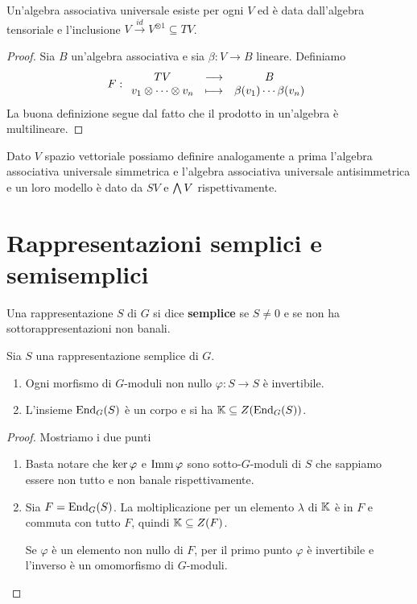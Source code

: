\begin{proposition}
Un'algebra associativa universale esiste per ogni $V$ ed \`e data dall'algebra tensoriale e l'inclusione $V\overset{id}{\to} V^{\otimes 1}\subseteq TV$.
\end{proposition}
\begin{proof}
Sia $B$ un'algebra associativa e sia $\beta:V\to B$ lineare. Definiamo
\[F:\begin{array}{ccc} {TV} & \longrightarrow & {B}\\ {v_1\otimes\cdots\otimes v_n} & \longmapsto & {\beta(v_1)\cdots \beta(v_n)} \end{array}\]
La buona definizione segue dal fatto che il prodotto in un'algebra \`e multilineare.
\end{proof}

\begin{remark}
Dato $V$ spazio vettoriale possiamo definire analogamente a prima l'algebra associativa universale simmetrica e l'algebra associativa universale antisimmetrica e un loro modello \`e dato da $SV$ e $\bigwedge V$ rispettivamente.
\end{remark}













\section{Rappresentazioni semplici e semisemplici}


\begin{definition}
    Una rappresentazione $S$ di $G$ si dice \textbf{semplice} se $S\ne 0$ e se non ha sottorappresentazioni non banali.
\end{definition}

\begin{lemma}\label{LmSchur} Sia $S$ una rappresentazione semplice di $G$. \begin{enumerate}
    \item Ogni morfismo di $G$-moduli  non nullo $\varphi\colon S \to S$ è invertibile.
    \item L'insieme $\operatorname{End}_G(S)$ è un corpo e si ha $\mathbb{K}\subseteq Z(\operatorname{End}_G(S))$.
\end{enumerate}
\end{lemma}
\begin{proof}
Mostriamo i due punti
\setlength{\leftmargini}{0cm}
\begin{enumerate}
\item Basta notare che $\ker\varphi$ e $\operatorname{Imm} \varphi$ sono sotto-$G$-moduli di $S$ che sappiamo essere non tutto e non banale rispettivamente.
\item Sia $F=\operatorname{End}_G(S)$. La moltiplicazione per un elemento $\lambda$ di $\mathbb{K}$ è in $F$ e commuta con tutto $F$, quindi $\mathbb{K}\subseteq Z(F)$. 

Se $\varphi$ è un elemento non nullo di $F$, per il primo punto $\varphi$ è invertibile e l'inverso è un omomorfismo di $G$-moduli.
\end{enumerate}
\setlength{\leftmargini}{0.5cm}
\end{proof}

